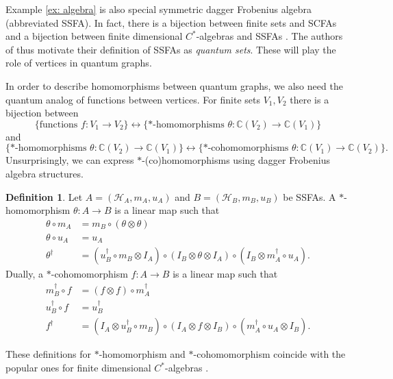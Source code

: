 \documentclass[12pt]{article}
\theoremstyle{definition}
\newtheorem{definition}[theorem]{Definition}
\newcommand{\C}{\mathbb C}
\newcommand{\mc}[1]{\mathcal{#1}}
\newcommand{\<}{\langle}
\renewcommand{\>}{\rangle}
\begin{document}
Example \ref{ex: algebra} is also special symmetric dagger Frobenius algebra (abbreviated SSFA). In fact, there is a bijection between finite sets and SCFAs \cite[Corollary 7.2]{scfa-sets} and a bijection between finite dimensional $C^*$-algebras and SSFAs \cite[Theorem 4.6]{vicary}. The authors of \cite{musto-reutter-verdon} thus motivate their definition of SSFAs as \textit{quantum sets}. These will play the role of vertices in quantum graphs. 

In order to describe homomorphisms between quantum graphs, we also need the quantum analog of functions between vertices. For finite sets $V_1, V_2$ there is a bijection between
\[
\{\text{functions } f: V_1 \to V_2\} \leftrightarrow \{*\text{-homomorphisms } \theta: \C(V_2) \to \C(V_1)\}
\]
and 
\[
\{*\text{-homomorphisms } \theta: \C(V_2) \to \C(V_1)\} \leftrightarrow \{*\text{-cohomomorphisms } \theta: \C(V_1) \to \C(V_2)\}.
\]
Unsurprisingly, we can express $*$-(co)homomorphisms using dagger Frobenius algebra structures.
\begin{definition} \label{defn: *-cohom}
    Let $A = (\mc H_A, m_A, u_A)$ and $B = (\mc H_B, m_B, u_B)$ be SSFAs. A $*$-homomorphism $\theta: A \to B$ is a linear map such that
    \begin{align*}
    \theta \circ m_A &= m_B \circ (\theta \otimes \theta) \\
    \theta \circ u_A &= u_A \\
    \theta^\dagger &= (u_B^\dagger \circ m_B \otimes I_A) \circ (I_B \otimes \theta \otimes I_A) \circ (I_B \otimes m_A^\dagger \circ u_A).
    \end{align*}
    Dually, a $*$-cohomomorphism $f: A \to B$ is a linear map such that
    \begin{align*}
        m_B^\dagger \circ f &= (f \otimes f) \circ m_A^\dagger \\
        u_B^\dagger \circ f &= u_B^\dagger \\
        f^\dagger &= (I_A \otimes u_B^\dagger \circ m_B) \circ (I_A \otimes f \otimes I_B) \circ (m_A^\dagger \circ u_A \otimes I_B).
    \end{align*}
\end{definition}
These definitions for $*$-homomorphism and $*$-cohomomorphism coincide with the popular ones for finite dimensional $C^*$-algebras \cite[Theorem 4.7]{vicary}.


\clearpage

\printbibliography[
heading=bibintoc,
title={References}
]
\end{document}
